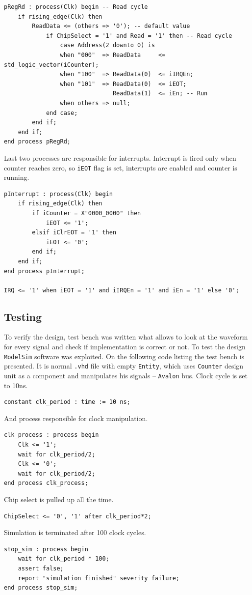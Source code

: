 \begin{verbatim}
pRegRd : process(Clk) begin -- Read cycle
    if rising_edge(Clk) then
        ReadData <= (others => '0'); -- default value
            if ChipSelect = '1' and Read = '1' then -- Read cycle
                case Address(2 downto 0) is
                when "000"  => ReadData     <= std_logic_vector(iCounter);
                when "100"  => ReadData(0)  <= iIRQEn;
                when "101"  => ReadData(0)  <= iEOT;
                               ReadData(1)  <= iEn; -- Run
                when others => null;
            end case;
        end if;
    end if;
end process pRegRd;
\end{verbatim}
Last two processes are responsible for interrupts. Interrupt is fired only when counter reaches zero, so \verb|iEOT| flag is set, interrupts are enabled and counter is running.
\begin{verbatim}
pInterrupt : process(Clk) begin
    if rising_edge(Clk) then
        if iCounter = X"0000_0000" then
            iEOT <= '1';
        elsif iClrEOT = '1' then
            iEOT <= '0';
        end if;
    end if;
end process pInterrupt;

IRQ <= '1' when iEOT = '1' and iIRQEn = '1' and iEn = '1' else '0';
\end{verbatim}

\subsection{Testing}
To verify the design, test bench was written what allows to look at the waveform for every signal and check if implementation is correct or not. To test the design \verb|ModelSim| software was exploited. On the following code listing the test bench is presented. It is normal \verb|.vhd| file with empty \verb|Entity|, which uses \verb|Counter| design unit as a component and manipulates his signals -- \verb|Avalon| bus. Clock cycle is set to 10ns. 
\begin{verbatim}
constant clk_period : time := 10 ns;
\end{verbatim}
And process responsible for clock manipulation. 
\begin{verbatim}
clk_process : process begin
    Clk <= '1';
    wait for clk_period/2;
    Clk <= '0';
    wait for clk_period/2;
end process clk_process;
\end{verbatim}
Chip select is pulled up all the time.
\begin{verbatim}
ChipSelect <= '0', '1' after clk_period*2;
\end{verbatim}
Simulation is terminated after 100 clock cycles.
\begin{verbatim}
stop_sim : process begin
    wait for clk_period * 100;
    assert false;
    report "simulation finished" severity failure;
end process stop_sim;
\end{verbatim}


